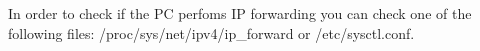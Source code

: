 In order to check if the PC perfoms IP forwarding you can check one of the following files: /proc/sys/net/ipv4/ip_forward or /etc/sysctl.conf.